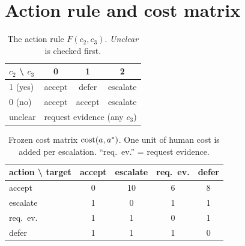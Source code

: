 \section{Action rule and cost matrix}
\label{app:rules}
\begin{table}[h]
\centering
\caption{The action rule $F(c_2, c_3)$. \emph{Unclear} is checked first.}
\label{tab:F}

\small
\begin{tabular}{lccc}
\toprule
$c_2$ \textbackslash{} $c_3$ & 0 & 1 & 2 \\
\midrule
1 (yes)    & accept & defer  & escalate \\
0 (no)     & accept & accept & escalate \\
unclear    & \multicolumn{3}{c}{request evidence (any $c_3$)} \\
\bottomrule
\end{tabular}

\end{table}

\begin{table}[h]
\centering
\caption{Frozen cost matrix $\mathrm{cost}(a, a^{*})$. One unit of human
cost is added per escalation. ``req.\ ev.'' = request evidence.}
\label{tab:cost}

\small
\begin{tabular}{lcccc}
\toprule
action \textbackslash{} target & accept & escalate & req.\ ev. & defer \\
\midrule
accept           & 0 & 10 & 6 & 8 \\
escalate         & 1 & 0  & 1 & 1 \\
req.\ ev. & 1 & 1  & 0 & 1 \\
defer            & 1 & 1  & 1 & 0 \\
\bottomrule
\end{tabular}

\end{table}

